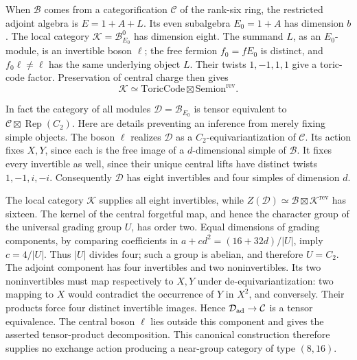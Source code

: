 When $\mathcal B$ comes from a categorification $\mathcal C$ of the
rank-six ring, the restricted adjoint algebra is $E=1+A+L$.
Its even subalgebra $E_0=1+A$ has dimension $b$.
The local category $\mathcal K=\mathcal B_{E_0}^{0}$ has dimension eight.
The summand $L$, as an $E_0$-module, is an invertible boson $\ell$;
the free fermion $f_0=fE_0$ is distinct, and $f_0\ell\ne\ell$ has the
same underlying object $L$. Their twists $1,-1,1,1$ give a toric-code
factor. Preservation of central charge then gives
\[
 \mathcal K\simeq\mathrm{ToricCode}\boxtimes\mathrm{Semion}^{\mathrm{rev}}.
\]

In fact the category of all modules $\mathcal D=\mathcal B_{E_0}$ is
tensor equivalent to $\mathcal C\boxtimes\operatorname{Rep}(C_2)$.
Here are details preventing an inference from merely fixing simple
objects. The boson $\ell$ realizes $\mathcal D$ as a
$C_2$-equivariantization of $\mathcal C$. Its action fixes $X,Y$, since
each is the free image of a $d$-dimensional simple of $\mathcal B$.
It fixes every invertible as well, since their unique central lifts
have distinct twists $1,-1,i,-i$. Consequently $\mathcal D$ has eight
invertibles and four simples of dimension $d$.

The local category $\mathcal K$ supplies all eight invertibles, while
$Z(\mathcal D)\simeq\mathcal B\boxtimes\mathcal K^{\mathrm{rev}}$
has sixteen. The kernel of the central forgetful map, and hence the
character group of the universal grading group $U$, has order two.
Equal dimensions of grading components, by comparing coefficients in
$a+cd^2=(16+32d)/|U|$, imply $c=4/|U|$. Thus $|U|$ divides four;
such a group is abelian, and therefore $U=C_2$.
The adjoint component has four invertibles and two noninvertibles.
Its two noninvertibles must map respectively to $X,Y$ under
de-equivariantization: two mapping to $X$ would contradict the occurrence
of $Y$ in $X^2$, and conversely. Their products force four distinct
invertible images. Hence $\mathcal D_{\rm ad}\to\mathcal C$ is a tensor
equivalence. The central boson $\ell$ lies outside this component and
gives the asserted tensor-product decomposition. This canonical
construction therefore supplies no exchange action producing a
near-group category of type $(8,16)$.

